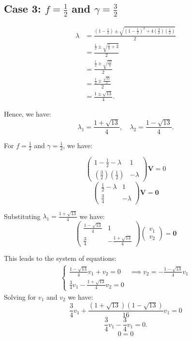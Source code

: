\documentclass [a4paper]{article}
\begin{document}
\subsection*{Case 3: \( f = \frac{1}{2} \) and \( \gamma = \frac{3}{2} \)}

\begin{align*}
   \lambda &= \frac{\left(1 - \frac{1}{2}\right) \pm \sqrt{\left(1 - \frac{1}{2}\right)^2 + 4 \left(\frac{3}{2}\right) \left(\frac{1}{2}\right)}}{2} \\
   &= \frac{\frac{1}{2} \pm \sqrt{\frac{1}{4} + 3}}{2} \\
   &= \frac{\frac{1}{2} \pm \sqrt{\frac{13}{4}}}{2} \\
   &= \frac{\frac{1}{2} \pm \frac{\sqrt{13}}{2}}{2} \\
   &= \frac{1 \pm \sqrt{13}}{4}.
\end{align*}

Hence, we have: 
   \[
   \lambda_1 = \frac{1 + \sqrt{13}}{4}, \quad \lambda_2 = \frac{1 - \sqrt{13}}{4}.
   \]

For \(f = \frac{1}{2}\) and \(\gamma = \frac{1}{2}\), we have: 

\[
     \begin{pmatrix} 1 - \frac{1}{2} - \lambda & 1 \\ \left(\frac{3}{2}\right) \left(\frac{1}{2}\right) & -\lambda \end{pmatrix}\mathbf{V} = 0
\]
\[
\begin{pmatrix} \frac{1}{2} - \lambda & 1 \\ \frac{3}{4} & -\lambda \end{pmatrix} \mathbf{V} = \mathbf{0}
\]


Substituting \(\lambda_1 = \frac{1 + \sqrt{13}}{4}\) we have:
\[
\begin{pmatrix} \frac{1 - \sqrt{13}}{4} & 1 \\ \frac{3}{4} & -\frac{1 + \sqrt{13}}{4} \end{pmatrix} \begin{pmatrix} v_1 \\ v_2 \end{pmatrix} = \textbf{0}
\]

This leads to the system of equations:
\begin{align*}
\begin{cases}
\frac{1 - \sqrt{13}}{4} v_1 + v_2 = 0 & \implies v_2 = -\frac{1 - \sqrt{13}}{4} v_1 \\[1em]
\frac{3}{4} v_1 - \frac{1 + \sqrt{13}}{4} v_2 = 0 &
\end{cases}
\end{align*}
\newpage
Solving for \(v_1\) and \(v_2\) we have: 
\[
\frac{3}{4} v_1 + \frac{(1 + \sqrt{13})(1 - \sqrt{13})}{16}v_1  = 0
\]
\[
\frac{3}{4} v_1 - \frac{3}{4} v_1 = 0.
\]
\[0=0\]
\end{document}
